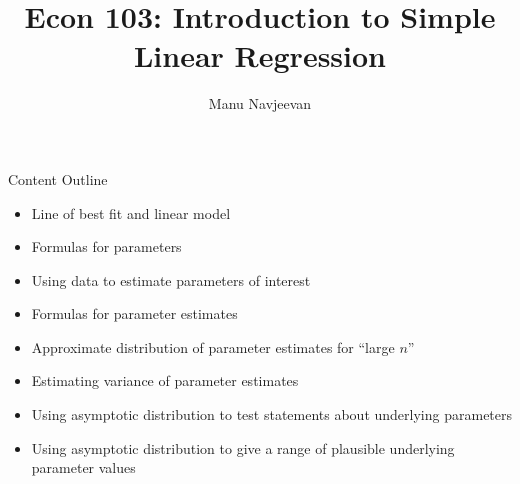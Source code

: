 \documentclass[notheorems, 9pt, handout]{beamer}
\title{Econ 103: Introduction to Simple Linear Regression}
\author{Manu Navjeevan}
\institute{UCLA}
\begin{document}
\frame{\titlepage}
\begin{frame}{Content Outline} 
	\label{frame:content-outline}
	\begin{itemize}
		\item Line of best fit and linear model
		\item Formulas for parameters 
	\end{itemize}
	\begin{itemize}
		\item Using data to estimate parameters of interest
		\item Formulas for parameter estimates
	\end{itemize}
	\begin{itemize}
		\item Approximate distribution of parameter estimates for ``large \(n\)''
		\item Estimating variance of parameter estimates
	\end{itemize}
	\begin{itemize}
		\item Using asymptotic distribution to test statements about underlying parameters
		\item Using asymptotic distribution to give a range of plausible underlying parameter values 
	\end{itemize}
\end{frame}
\end{document}
